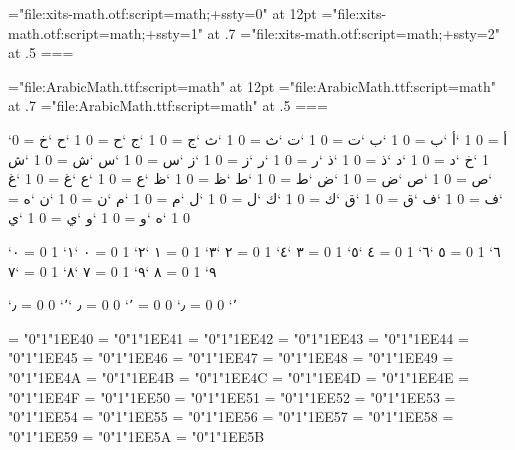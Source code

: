\def\mathfont{file:xits-math.otf:script=math}
\font\math="\mathfont;+ssty=0" at 12pt
\font\maths="\mathfont;+ssty=1" at .7\math
\font\mathss="\mathfont;+ssty=2" at .5\math
{}=\math {}=\maths {}=\mathss
{}

\font\arabicmath="file:ArabicMath.ttf:script=math" at 12pt
\font\arabicmaths="file:ArabicMath.ttf:script=math" at .7\arabicmath
\font\arabicmathss="file:ArabicMath.ttf:script=math" at .5\arabicmath
{}=\arabicmath {}=\arabicmaths {}=\arabicmathss

\Umathcode`أ = 0 1 `أ   \Umathcode`ب = 0 1 `ب   \Umathcode`ت = 0 1 `ت
\Umathcode`ث = 0 1 `ث   \Umathcode`ج = 0 1 `ج   \Umathcode`ح = 0 1 `ح
\Umathcode`خ = 0 1 `خ   \Umathcode`د = 0 1 `د   \Umathcode`ذ = 0 1 `ذ
\Umathcode`ر = 0 1 `ر   \Umathcode`ز = 0 1 `ز   \Umathcode`س = 0 1 `س
\Umathcode`ش = 0 1 `ش   \Umathcode`ص = 0 1 `ص   \Umathcode`ض = 0 1 `ض
\Umathcode`ط = 0 1 `ط   \Umathcode`ظ = 0 1 `ظ   \Umathcode`ع = 0 1 `ع
\Umathcode`غ = 0 1 `غ   \Umathcode`ف = 0 1 `ف   \Umathcode`ق = 0 1 `ق
\Umathcode`ك = 0 1 `ك   \Umathcode`ل = 0 1 `ل   \Umathcode`م = 0 1 `م
\Umathcode`ن = 0 1 `ن   \Umathcode`ه = 0 1 `ه   \Umathcode`و = 0 1 `و
\Umathcode`ي = 0 1 `ي

\Umathcode`٠ = 0 1 `٠   \Umathcode`١ = 0 1 `١   \Umathcode`٢ = 0 1 `٢
\Umathcode`٣ = 0 1 `٣   \Umathcode`٤ = 0 1 `٤   \Umathcode`٥ = 0 1 `٥
\Umathcode`٦ = 0 1 `٦   \Umathcode`٧ = 0 1 `٧   \Umathcode`٨ = 0 1 `٨
\Umathcode`٩ = 0 1 `٩

\Umathcode`٫ = 0 0 `٫
\Umathcode`٬ = 0 0 `٬
\Umathchardef{} = 0 0 `٫
\Umathchardef{} = 0 0 `٬

\Umathchardef\Alef = "0"1"1EE40
\Umathchardef\Ba = "0"1"1EE41
\Umathchardef\Jeem = "0"1"1EE42
\Umathchardef\Dal = "0"1"1EE43
\Umathchardef\Ha = "0"1"1EE44
\Umathchardef\Waw = "0"1"1EE45
\Umathchardef\Za = "0"1"1EE46
\Umathchardef\HHa = "0"1"1EE47
\Umathchardef\TTaa = "0"1"1EE48
\Umathchardef\Ya = "0"1"1EE49
\Umathchardef\Kaf = "0"1"1EE4A
\Umathchardef\Lam = "0"1"1EE4B
\Umathchardef\Meem = "0"1"1EE4C
\Umathchardef\Noon = "0"1"1EE4D
\Umathchardef\Seen = "0"1"1EE4E
\Umathchardef\Ayn = "0"1"1EE4F
\Umathchardef\Fa = "0"1"1EE50
\Umathchardef\Sad = "0"1"1EE51
\Umathchardef\Qaf = "0"1"1EE52
\Umathchardef\Ra = "0"1"1EE53
\Umathchardef\Sheen = "0"1"1EE54
\Umathchardef\Ta = "0"1"1EE55
\Umathchardef\Tha = "0"1"1EE56
\Umathchardef\Kha = "0"1"1EE57
\Umathchardef\Dhal = "0"1"1EE58
\Umathchardef\Dad = "0"1"1EE59
\Umathchardef\Zzaa = "0"1"1EE5A
\Umathchardef\Ghain = "0"1"1EE5B

